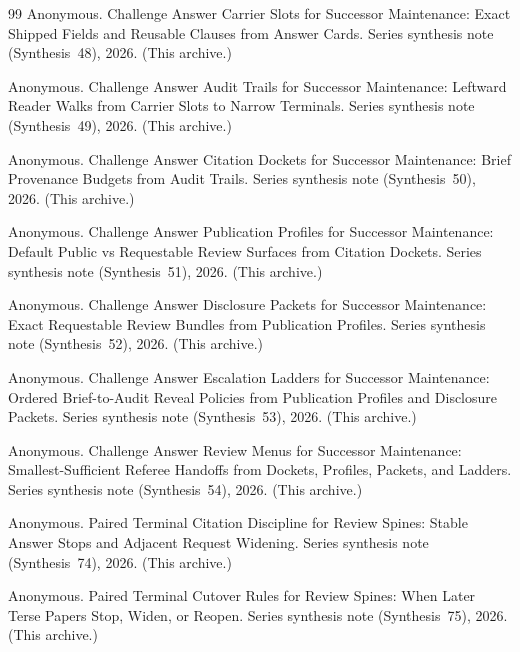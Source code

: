 \documentclass[11pt]{article}
\begin{document}
\begin{thebibliography}{99}
Anonymous.
\newblock Challenge Answer Carrier Slots for Successor Maintenance: Exact Shipped Fields and Reusable Clauses from Answer Cards.
\newblock Series synthesis note (Synthesis~48), 2026. (This archive.)

Anonymous.
\newblock Challenge Answer Audit Trails for Successor Maintenance: Leftward Reader Walks from Carrier Slots to Narrow Terminals.
\newblock Series synthesis note (Synthesis~49), 2026. (This archive.)

Anonymous.
\newblock Challenge Answer Citation Dockets for Successor Maintenance: Brief Provenance Budgets from Audit Trails.
\newblock Series synthesis note (Synthesis~50), 2026. (This archive.)

Anonymous.
\newblock Challenge Answer Publication Profiles for Successor Maintenance: Default Public vs Requestable Review Surfaces from Citation Dockets.
\newblock Series synthesis note (Synthesis~51), 2026. (This archive.)

Anonymous.
\newblock Challenge Answer Disclosure Packets for Successor Maintenance: Exact Requestable Review Bundles from Publication Profiles.
\newblock Series synthesis note (Synthesis~52), 2026. (This archive.)

Anonymous.
\newblock Challenge Answer Escalation Ladders for Successor Maintenance: Ordered Brief-to-Audit Reveal Policies from Publication Profiles and Disclosure Packets.
\newblock Series synthesis note (Synthesis~53), 2026. (This archive.)

Anonymous.
\newblock Challenge Answer Review Menus for Successor Maintenance: Smallest-Sufficient Referee Handoffs from Dockets, Profiles, Packets, and Ladders.
\newblock Series synthesis note (Synthesis~54), 2026. (This archive.)

Anonymous.
\newblock Paired Terminal Citation Discipline for Review Spines: Stable Answer Stops and Adjacent Request Widening.
\newblock Series synthesis note (Synthesis~74), 2026. (This archive.)

Anonymous.
\newblock Paired Terminal Cutover Rules for Review Spines: When Later Terse Papers Stop, Widen, or Reopen.
\newblock Series synthesis note (Synthesis~75), 2026. (This archive.)


\end{thebibliography}
\end{document}
